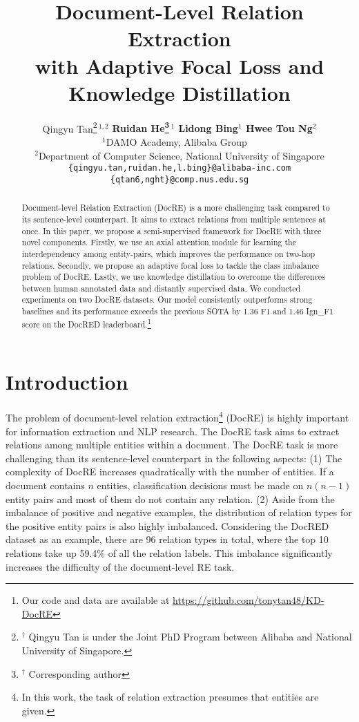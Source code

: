 \documentclass[11pt]{article}
\title{Document-Level Relation Extraction \\ with Adaptive Focal Loss and Knowledge Distillation}
\author{Qingyu Tan\thanks{$^\dag$  Qingyu Tan is under the Joint PhD Program between Alibaba and National University of Singapore.}$^{~1,2}$ \quad \textbf{Ruidan He\thanks{$^\dag$  Corresponding author}$^{~1}$ \quad Lidong Bing$^{1}$ \quad Hwee Tou Ng$^{2}$} 
\\$^1$DAMO Academy, Alibaba Group~~\\
$^2$Department of Computer Science, National University of Singapore\\
\texttt{\{qingyu.tan,ruidan.he,l.bing\}@alibaba-inc.com}\\
\texttt{\{qtan6,nght\}@comp.nus.edu.sg}\\
}
\begin{document}
\maketitle
\begin{abstract}
Document-level Relation Extraction (DocRE) is a more challenging task compared to its sentence-level counterpart. It aims to extract relations from multiple sentences at once. In this paper, we propose a semi-supervised framework for DocRE with three novel components. Firstly, we use an axial attention module for learning the interdependency among entity-pairs, which improves the performance on two-hop relations. Secondly, we propose an adaptive focal loss to tackle the class imbalance problem of DocRE. Lastly, we use knowledge distillation to overcome the differences between human annotated data and distantly supervised data. We conducted experiments on two DocRE datasets. Our model consistently outperforms strong baselines and its performance exceeds the previous SOTA by 1.36 F1 and 1.46 Ign\_F1 score on the DocRED leaderboard.\footnote{Our code and data are available at {\url{https://github.com/tonytan48/KD-DocRE}}} 
\end{abstract}



\section{Introduction}






The problem of document-level relation extraction\footnote{In this work, the task of relation extraction presumes that entities are given.} (DocRE) is highly important for information extraction and NLP research. The DocRE task aims to extract relations among multiple entities within a document. The DocRE task is more challenging than its sentence-level counterpart in the following aspects: (1) The complexity of DocRE increases quadratically with the number of entities. If a document contains $n$ entities, classification decisions must be made on $n(n-1)$ entity pairs and most of them do not contain any relation. (2) Aside from the imbalance of positive and negative examples, the distribution of relation types for the positive entity pairs is also highly imbalanced. Considering the DocRED \citep{yao2019docred} dataset as an example, there are 96 relation types in total, where the top 10 relations take up 59.4\% of all the relation labels. This imbalance significantly increases the difficulty of the document-level RE task.
\end{document}
